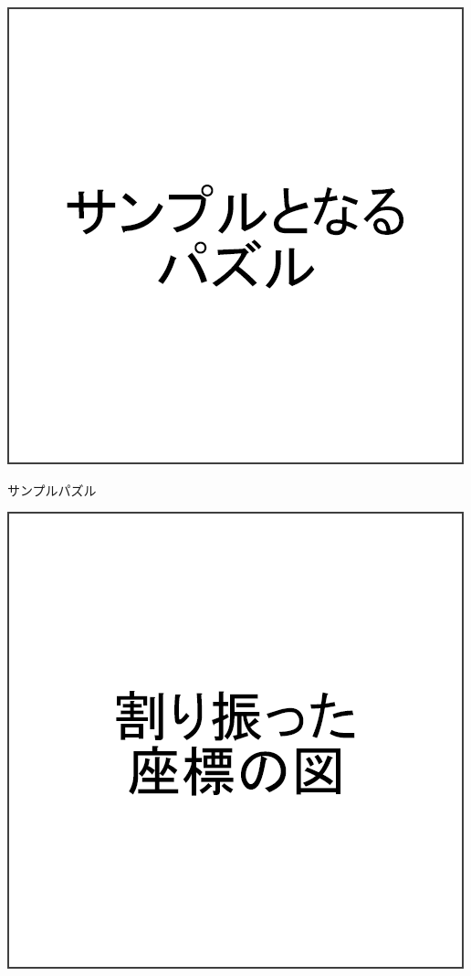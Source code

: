 \begin{clearpagefigure}
  \includegraphics[width=0.8\linewidth,clip]{fig/samplePuzzle.png}
  \caption{サンプルパズル}
  \label{figure:SamplePuzzle}
\end{clearpagefigure}

\begin{clearpagefigure}
  \includegraphics[width=0.8\linewidth,clip]{fig/coordinate.png}
  \caption{}
  \label{figure:Coordinate}
\end{clearpagefigure}

